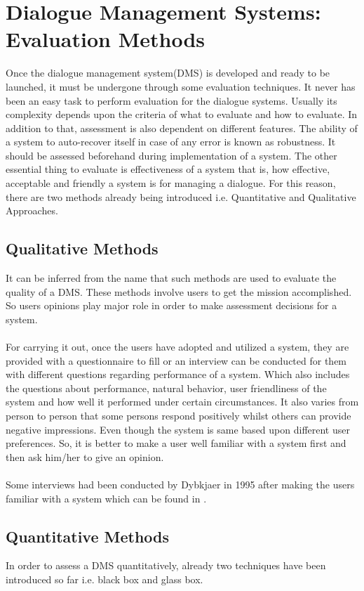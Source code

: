 \section{Dialogue Management Systems: Evaluation Methods}
Once the dialogue management system(DMS) is developed and ready to be launched, it must be undergone through some evaluation techniques. It never has been an easy task to perform evaluation for the dialogue systems. Usually its complexity depends upon the criteria of what to evaluate and how to evaluate. In addition to that, assessment is also dependent on different features. The ability of a system to auto-recover itself in case of any error is known as robustness. It should be assessed beforehand during implementation of a system. The other essential thing to evaluate is effectiveness of a system that is, how effective, acceptable and friendly a system is for managing a dialogue. For this reason, there are two methods already being introduced i.e. Quantitative and Qualitative Approaches.

\subsection{Qualitative Methods}
It can be inferred from the name that such methods are used to evaluate the quality of a DMS. These methods involve users to get the mission accomplished. So users opinions play major role in order to make assessment decisions for a system. 
\\~\\
For carrying it out, once the users have adopted and utilized a system, they are provided with a questionnaire to fill or an interview can be conducted for them with different questions regarding performance of a system. Which also includes the questions about performance, natural behavior, user friendliness of the system and how well it performed under certain circumstances. It also varies from person to person that some persons respond positively whilst others can provide negative impressions. Even though the system is same based upon different user preferences. So, it is better to make a user well familiar with a system first and then ask him/her to give an opinion.
\\~\\
Some interviews had been conducted by Dybkjaer in 1995 after making the users familiar with a system which can be found in \cite{qualitativeevaluation}.

\subsection{Quantitative Methods}
In order to assess a DMS quantitatively, already two techniques have been introduced so far i.e. black box and glass box. 

